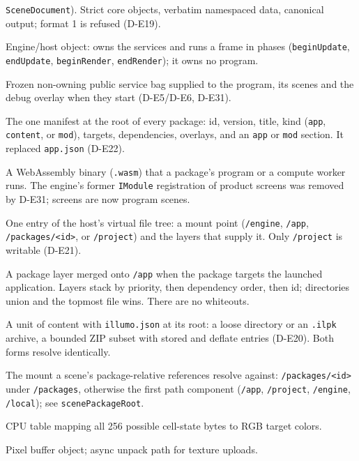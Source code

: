 \begin{description}[style=nextline, leftmargin=0pt]
    \texttt{SceneDocument}). Strict core objects, verbatim namespaced data,
    canonical output; format 1 is refused (D-E19).
  \item[Illumo]
    Engine/host object: owns the services and runs a frame in phases
    (\texttt{beginUpdate}, \texttt{endUpdate}, \texttt{beginRender},
    \texttt{endRender}); it owns no program.
  \item[IllumoContext]
    Frozen non-owning public service bag supplied to the program, its scenes
    and the debug overlay when they start (D-E5/D-E6, D-E31).
  \item[illumo.json]
    The one manifest at the root of every package: id, version, title, kind
    (\texttt{app}, \texttt{content}, or \texttt{mod}), targets, dependencies,
    overlays, and an \texttt{app} or \texttt{mod} section. It replaced
    \texttt{app.json} (D-E22).
  \item[Module]
    A WebAssembly binary (\texttt{.wasm}) that a package's program or a
    compute worker runs. The engine's former \texttt{IModule} registration of
    product screens was removed by D-E31; screens are now program scenes.
  \item[Mount]
    One entry of the host's virtual file tree: a mount point
    (\texttt{/engine}, \texttt{/app}, \texttt{/packages/<id>}, or
    \texttt{/project}) and the layers that supply it. Only \texttt{/project}
    is writable (D-E21).
  \item[Overlay]
    A package layer merged onto \texttt{/app} when the package targets the
    launched application. Layers stack by priority, then dependency order,
    then id; directories union and the topmost file wins. There are no
    whiteouts.
  \item[Package (.ilpk)]
    A unit of content with \texttt{illumo.json} at its root: a loose directory
    or an \texttt{.ilpk} archive, a bounded ZIP subset with stored and deflate
    entries (D-E20). Both forms resolve identically.
  \item[Package root]
    The mount a scene's package-relative references resolve against:
    \texttt{/packages/<id>} under \texttt{/packages}, otherwise the first path
    component (\texttt{/app}, \texttt{/project}, \texttt{/engine},
    \texttt{/local}); see \texttt{scenePackageRoot}.
  \item[Palette]
    CPU table mapping all 256 possible cell-state bytes to RGB target colors.
  \item[PBO]
    Pixel buffer object; async unpack path for texture uploads.

\end{description}
